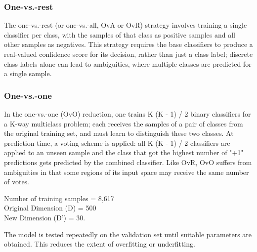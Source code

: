 \documentclass[letterpaper,12pt, onecolumn]{article}%
\begin{document}
\subsubsection*{One-vs.-rest}
The one-vs.-rest (or one-vs.-all, OvA or OvR) strategy involves training a single classifier per class, with the samples of that class as positive samples and all other samples as negatives. This strategy requires the base classifiers to produce a real-valued confidence score for its decision, rather than just a class label; discrete class labels alone can lead to ambiguities, where multiple classes are predicted for a single sample. 

\subsubsection*{One-vs.-one}
In the one-vs.-one (OvO) reduction, one trains K (K - 1) / 2 binary classifiers for a K-way multiclass problem; each receives the samples of a pair of classes from the original training set, and must learn to distinguish these two classes. At prediction time, a voting scheme is applied: all K (K - 1) / 2 classifiers are applied to an unseen sample and the class that got the highest number of "+1" predictions gets predicted by the combined classifier. Like OvR, OvO suffers from ambiguities in that some regions of its input space may receive the same number of votes.
\begin{center}
Number of training samples = 8,617 \\
Original Dimension (D)     = 500 \\
New Dimension (D') 	       = 30.
\end{center}
The model is tested repeatedly on the validation set until suitable parameters are obtained. This reduces the extent of overfitting or underfitting. 
\end{document}
